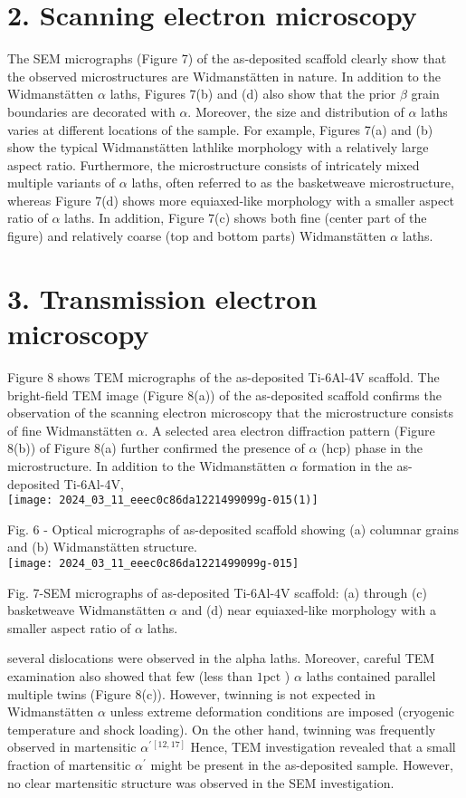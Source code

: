 \documentclass[10pt]{article}
\begin{document}
\section*{2. Scanning electron microscopy}
The SEM micrographs (Figure 7) of the as-deposited scaffold clearly show that the observed microstructures are Widmanstätten in nature. In addition to the Widmanstätten $\alpha$ laths, Figures 7(b) and (d) also show that the prior $\beta$ grain boundaries are decorated with $\alpha$. Moreover, the size and distribution of $\alpha$ laths varies at different locations of the sample. For example, Figures 7(a) and (b) show the typical Widmanstätten lathlike morphology with a relatively large aspect ratio. Furthermore, the microstructure consists of intricately mixed multiple variants of $\alpha$ laths, often referred to as the basketweave microstructure, whereas Figure 7(d) shows more equiaxed-like morphology with a smaller aspect ratio of $\alpha$ laths. In addition, Figure 7(c) shows both fine (center part of the figure) and relatively coarse (top and bottom parts) Widmanstätten $\alpha$ laths.

\section*{3. Transmission electron microscopy}
Figure 8 shows TEM micrographs of the as-deposited Ti-6Al-4V scaffold. The bright-field TEM image (Figure 8(a)) of the as-deposited scaffold confirms the observation of the scanning electron microscopy that the microstructure consists of fine Widmanstätten $\alpha$. A selected area electron diffraction pattern (Figure 8(b)) of Figure 8(a) further confirmed the presence of $\alpha$ (hcp) phase in the microstructure. In addition to the Widmanstätten $\alpha$ formation in the as-deposited Ti-6Al-4V,\\
\texttt{[image: 2024\_03\_11\_eeec0c86da1221499099g-015(1)]}

Fig. 6 - Optical micrographs of as-deposited scaffold showing (a) columnar grains and (b) Widmanstätten structure.\\
\texttt{[image: 2024\_03\_11\_eeec0c86da1221499099g-015]}

Fig. 7-SEM micrographs of as-deposited Ti-6Al-4V scaffold: (a) through (c) basketweave Widmanstätten $\alpha$ and (d) near equiaxed-like morphology with a smaller aspect ratio of $\alpha$ laths.

several dislocations were observed in the alpha laths. Moreover, careful TEM examination also showed that few (less than $1 \mathrm{pct}$ ) $\alpha$ laths contained parallel multiple twins (Figure 8(c)). However, twinning is not expected in Widmanstätten $\alpha$ unless extreme deformation conditions are imposed (cryogenic temperature and shock loading). On the other hand, twinning was frequently observed in martensitic $\alpha^{\prime}{ }^{[12,17]}$ Hence, TEM investigation revealed that a small fraction of martensitic $\alpha^{\prime}$ might be present in the as-deposited sample. However, no clear martensitic structure was observed in the SEM investigation.
\end{document}
